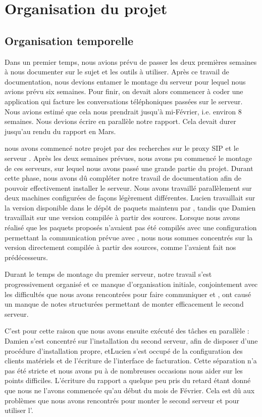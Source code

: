 \section{Organisation du projet}

\subsection{Organisation temporelle}




Dans un premier temps, nous avions prévu de passer les deux premières semaines à nous documenter sur le sujet et les outils à utiliser. Après ce travail de documentation, nous devions entamer le montage du serveur pour lequel nous avions prévu six semaines. Pour finir, on devait alors commencer à coder une application qui facture les conversations téléphoniques passées sur le serveur. Nous avions	estimé que cela nous prendrait jusqu'à mi-Février, i.e. environ 8 semaines. Nous devions écrire en parallèle notre rapport. Cela devait durer jusqu'au rendu du rapport en Mars. 

 nous avons commencé notre projet par des recherches sur le proxy SIP {\kam} et le serveur {\frad}. Après les deux semaines prévues, nous avons pu commencé le montage de ces serveurs, sur lequel nous avons passé une grande partie du projet. Durant cette phase, nous avons dû compléter notre travail de documentation afin de pouvoir effectivement installer le serveur.
Nous avons travaillé parallèlement sur deux machines configurées de façons légèrement différentes. Lucien travaillait sur la version disponible dans le dépôt de paquets maintenu par {\kam}, tandis que Damien travaillait sur une version compilée à partir des sources. Lorsque nous avons réalisé que les paquets proposés n’avaient pas été compilés avec une configuration permettant la communication prévue avec {\frad}, nous nous sommes concentrés sur la version directement compilée à partir des sources, comme l’avaient fait nos prédécesseurs.


Durant le temps de montage du premier serveur, notre travail s’est progressivement organisé et ce manque d’organisation initiale, conjointement avec les difficultés que nous avons rencontrées pour faire communiquer {\kam} et {\frad}, ont causé un manque de notes structurées permettant de monter efficacement le second serveur.


C’est pour cette raison que nous avons ensuite exécuté des tâches en parallèle : Damien s’est concentré sur l’installation du second serveur, afin de disposer d’une procédure d’installation propre, et Lucien s’est occupé de la configuration des clients matériels et de l’écriture de l’interface de facturation. Cette séparation n’a pas été stricte et nous avons pu à de nombreuses occasions nous aider sur les points difficiles.
L'écriture du rapport a quelque peu pris du retard étant donné que nous ne l'avons commencée qu'au début du mois de Février. Cela est dû aux problèmes que nous avons rencontrés pour monter le second serveur et pour utiliser l'{\ata}.


